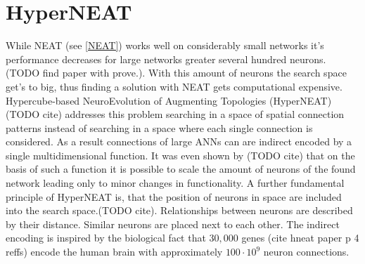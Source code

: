 \section{HyperNEAT}\label{HYPERNEAT}
 While NEAT (see \ref{NEAT}) works well on considerably small networks it's performance decreases for large networks greater several hundred neurons. (TODO find paper with prove.). With this amount of neurons the search space get's to big, thus finding a solution with NEAT gets computational expensive. 
 Hypercube-based NeuroEvolution of Augmenting Topologies (HyperNEAT) (TODO cite) addresses this problem searching in a space of spatial connection patterns instead of searching in a space where each single connection is considered. As a result connections of large ANNs can are indirect encoded by a single multidimensional function. It was even shown by (TODO cite) that on the basis of such a function it is possible to scale the amount of neurons of the found network leading only to minor changes in functionality. A further fundamental principle of HyperNEAT is, that the position of neurons in space are included into the search space.(TODO cite). Relationships between neurons are described by their distance. Similar neurons are placed next to each other. The indirect encoding is inspired by the biological fact that $30,000$ genes  (cite hneat paper p 4 reffs) encode the human brain with approximately $100 \cdot10^9$ neuron connections.
 
